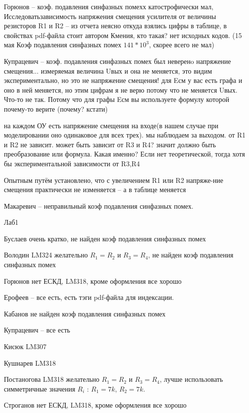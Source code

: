 \documentclass[a4paper,11pt]{article}
\begin{document}
Горюнов -- коэф. подавления синфазных помехх катострофически мал, Исследоватьзависимость напряжения смещения усилителя от величины резисторов R1 и R2
-- из отчета неясно откуда взялись цифры в таблице, в свойствах pdf-файла стоит автором Кмения, кто такая? нет исходных кодов. 
(15 мая Коэф подавления синфазных помех $141*10^3$, скорее всего не мал)

Купрацевич -- коэф. подавления синфазных помех был неверенo
напряжение смещения...
измеряемая величина Uвых и она не меняется, это видим экспериментально,
но это не напряжение смещения! для Eсм у вас есть графа и оно в ней меняется, но этим цифрам я не верю потому что не меняется Uвых.
Что-то не так.
Потому что для графы Eсм вы используете формулу которой почему-то верите (почему? кстати)

на каждом ОУ есть напряжение смещения на входе(в нашем случае при моделировании оно одинаковое для всех трех). мы наблюдаем за выходом. от R1 и R2 не зависит. может быть зависит от R3 и R4? значит должно быть преобразование или формула.
Какая именно? Если нет теоретической, тогда хотя бы экспериментальной зависимости от R3,R4

Опытным путём установлено, что с увеличением R1 или R2 напряже-ние смещения практически не изменяется -- а в таблице меняется


Макаревич -- неправильный коэф подавления синфазных помех.

\newpage
Лаб1 

Буслаев  очень кратко, не найден коэф подавления синфазных помех

Володин LM324  желательно $R_1=R_2$ и $R_3=R_4$, не найден коэф подавления синфазных помех

Горюнов  нет ЕСКД, LM318, кроме оформления все хорошо

Ерофеев -- все есть, есть тэги pdf-файла для индексации.

Кабанов  не найден коэф подавления синфазных помех

Купрацевич -- все есть

Кисюк LM307

Кушнарев LM318

Постаногова LM318 желательно $R_1=R_2$ и $R_3=R_4$, лучше использовать симметричные значения $R_i$ : $R_1=7k$, $R_2=7k$. 

Строганов нет ЕСКД, LM318, кроме оформления все хорошо
\end{document}
